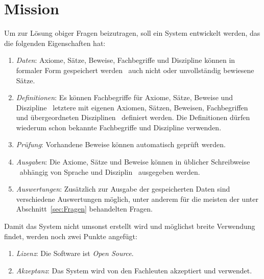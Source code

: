 \documentclass[english,ngerman,parskip=half,headsepline,footsepline]{scrreprt}
\newcounter{Enumi}
\begin{document}
	\section{Mission}
	\label{sec:Mission}
	Um zur Lösung obiger Fragen beizutragen, soll ein System entwickelt werden, das die folgenden Eigenschaften hat:
	
	\begin{enumerate}
		\item \label{Mission:Daten} \emph{Daten}: Axiome, Sätze, Beweise, Fachbegriffe und Diszipline können in formaler Form gespeichert werden \textendash\ auch nicht oder unvollständig bewiesene Sätze.
		
		\item \label{Mission:Definitionen} \emph{Definitionen}: Es können Fachbegriffe für Axiome, Sätze, Beweise und Diszipline \textendash\ letztere mit eigenen Axiomen, Sätzen, Beweisen, Fachbegriffen und übergeordneten Disziplinen \textendash\ definiert werden. Die Definitionen dürfen wiederum schon bekannte Fachbegriffe und Diszipline verwenden.
		
		\item \label{Mission:Prüfung} \emph{Prüfung}: Vorhandene Beweise können automatisch geprüft werden.
		
		\item \label{Mission:Ausgaben} \emph{Ausgaben}: Die Axiome, Sätze und Beweise können in üblicher Schreibweise \textendash\ abhängig von Sprache und Disziplin \textendash\ ausgegeben werden.
		
		\item \label{Mission:Auswertungen} \emph{Auswertungen}: Zusätzlich zur Ausgabe der gespeicherten Daten sind verschiedene Auswertungen möglich, unter anderem für die meisten der unter Abschnitt~\vref{sec:Fragen} behandelten Fragen.
		
		\setcounter{Enumi}{\value{enumi}}
	\end{enumerate}

	Damit das System nicht umsonst erstellt wird und möglichst breite Verwendung findet, werden noch zwei Punkte angefügt:
	
	\begin{enumerate}
		\setcounter{enumi}{\value{Enumi}}
		
		\item \label{Mission:Lizenz} \emph{Lizenz}: Die Software ist \emph{Open Source}.
		
		\item \label{Mission:Akzeptanz} \emph{Akzeptanz}: Das System wird von den Fachleuten akzeptiert und verwendet.
	\end{enumerate}
	
\end{document}
